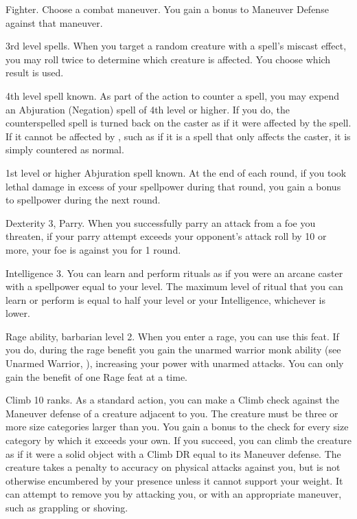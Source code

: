\featpre Fighter.
\featben Choose a combat maneuver.
You gain a  bonus to Maneuver Defense against that maneuver.

\featpre 3rd level spells.
\featben When you target a random creature with a spell's miscast effect, you may roll twice to determine which creature is affected.
You choose which result is used.

\featpre 4th level spell known.
\featben As part of the action to counter a spell, you may expend an Abjuration (Negation) spell of 4th level or higher.
If you do, the counterspelled spell is turned back on the caster as if it were affected by the 
spell.
If it cannot be affected by , such as if it is a spell that only affects the caster, it is simply countered as normal.

\featpre 1st level or higher Abjuration spell known.
\featben At the end of each round, if you took lethal damage in excess of your spellpower during that round, you gain a  bonus to spellpower during the next round.

\featpres Dexterity 3, Parry.
\featben When you successfully parry an attack from a foe you threaten, if your parry attempt exceeds your opponent's attack roll by 10 or more, your foe is  against you for 1 round.

\featpre Intelligence 3.
\featben You can learn and perform rituals as if you were an arcane caster with a spellpower equal to your level.
The maximum level of ritual that you can learn or perform is equal to half your level or your Intelligence, whichever is lower.

\featpre Rage ability, barbarian level 2.
\featben When you enter a rage, you can use this feat. If you do, during the rage benefit you gain the unarmed warrior monk ability (see Unarmed Warrior, ), increasing your power with unarmed attacks.
 You can only gain the benefit of one Rage feat at a time.

\featpre Climb 10 ranks.
\featben As a standard action, you can make a Climb check against the Maneuver defense of a creature adjacent to you.
The creature must be three or more size categories larger than you.
You gain a  bonus to the check for every size category by which it exceeds your own.
If you succeed, you can climb the creature as if it were a solid object with a Climb DR equal to its Maneuver defense.
The creature takes a  penalty to accuracy on physical attacks against you, but is not otherwise encumbered by your presence unless it cannot support your weight.
It can attempt to remove you by attacking you, or with an appropriate maneuver, such as grappling or shoving.

